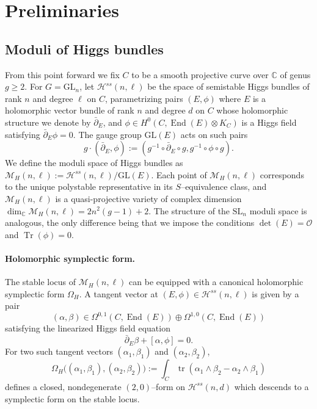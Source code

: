 \documentclass[twoside, 11pt]{article}
\numberwithin{equation}{section}
\theoremstyle{theorem}
\numberwithin{theorem}{section}
\theoremstyle{definition}
\DeclareMathOperator{\Tr}{Tr}
\newcommand{\pa}{\partial}
\begin{document}
\section{Preliminaries}

\subsection{Moduli of Higgs bundles}
From this point forward we fix $C$ to be a smooth projective curve over $\mathbb{C}$ of genus $g\ge 2$. For $G=\mathrm{GL}_n$, let $\mathcal H^{ss}(n,\ell)$ be the space of semistable Higgs bundles of rank $n$ and degree $\ell$ on $C$, parametrizing pairs $(E,\phi)$ where $E$ is a holomorphic vector bundle of rank $n$ and degree $d$ on $C$ whose holomorphic structure we denote by $\bar\pa_E$, and $\phi\in H^0\!\left(C,\operatorname{End}(E)\otimes K_C\right)$ is a Higgs field satisfying $\bar\pa_E \phi = 0$. The gauge group $\mathrm{GL}(E)$ acts on such pairs
%
\begin{equation*}
g\cdot (\bar\pa_E,\phi) := (g^{-1}\circ \bar\pa_E\circ g, g^{-1}\circ \phi\circ g). 
\end{equation*}
%
We define the moduli space of Higgs bundles as $\mathcal{M}_H(n,\ell):=\mathcal H^{ss}(n,\ell)/\mathrm{GL}(E)$. Each point of $\mathcal{M}_H(n,\ell)$ corresponds to the unique polystable representative in its $S$--equivalence class, and $\mathcal{M}_H(n,\ell)$ is a quasi-projective variety of complex dimension $\dim_{\mathbb{C}}\mathcal{M}_H(n,\ell)=2n^2(g-1)+2$. The structure of the $\mathrm{SL}_n$ moduli space is analogous, the only difference being that we impose the conditions $\det(E) = \mathcal O$ and $\Tr(\phi) = 0$. 


%
\paragraph{Holomorphic symplectic form.}

The stable locus of $\mathcal{M}_H(n,\ell)$ can be equipped with a canonical holomorphic symplectic form $\Omega_H$. A tangent vector at $(E,\phi)\in \mathcal H^{ss}(n,\ell)$ is given by a pair
\[
(\alpha,\beta)\in \Omega^{0,1}\!\left(C,\operatorname{End}(E)\right)\oplus \Omega^{1,0}\!\left(C,\operatorname{End}(E)\right)\]
satisfying the linearized Higgs field equation 
\[
\bar{\partial}_E\beta+[\alpha,\phi]=0.
\]
For two such tangent vectors $(\alpha_1,\beta_1)$ and $(\alpha_2,\beta_2)$,
\[
\Omega_H\bigl((\alpha_1,\beta_1),(\alpha_2,\beta_2)\bigr)
:=\int_C \operatorname{tr}\!\left(\alpha_1\wedge \beta_2-\alpha_2\wedge \beta_1\right)
\]
defines a closed, nondegenerate $(2,0)$--form on $\mathcal H^{ss}(n,d)$ which descends to a symplectic form on the stable locus.
\end{document}
